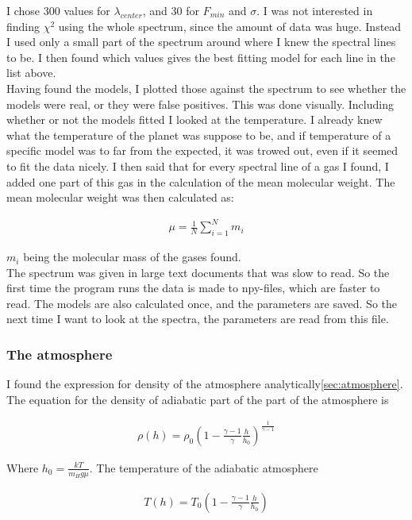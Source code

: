 \documentclass[a4paper, 10pt]{article}
\begin{document}
I chose 300 values for $\lambda_{center}$, and 30 for $F_{min}$ and $\sigma$. I was not interested in finding $\chi^2$ using the whole spectrum, since the amount of data was huge. Instead I used only a small part of the spectrum around where I knew the spectral lines to be. I then found which values gives the best fitting model for each line in the list above.\\

Having found the models, I plotted those against the spectrum to see whether the models were real, or they were false positives. This was done visually. Including whether or not the models fitted I looked at the temperature. I already knew what the temperature of the planet was suppose to be, and if temperature of a specific model was to far from the expected, it was trowed out, even if it seemed to fit the data nicely. I then said that for every spectral line of a gas I found, I added one part of this gas in the calculation of the mean molecular weight. The mean molecular weight was then calculated as:

\begin{align}
\mu = \frac{1}{N}\sum_{i=1}^N m_i
\end{align}

$m_i$ being the molecular mass of the gases found.\\

The spectrum was given in large text documents that was slow to read. So the first time the program runs the data is made to npy-files, which are faster to read. The models are also calculated once, and the parameters are saved. So the next time I want to look at the spectra, the parameters are read from this file. 

\subsubsection{The atmosphere}
I found the expression for density of the atmosphere analytically\ref{sec:atmosphere}. The equation for the density of adiabatic part of the part of the atmosphere is

\begin{align}
\rho (h) = \rho_0 \left(1-\frac{\gamma - 1}{\gamma} \frac{h}{h_0}\right)^{\frac{1}{\gamma - 1}}
\end{align}


Where $h_0 = \frac{kT}{m_H g \mu}$. The temperature of the adiabatic atmosphere

\begin{align}
T(h) = T_0 \left( 1 -\frac{\gamma - 1}{\gamma} \frac{h}{h_0} \right)
\end{align}
\end{document}

